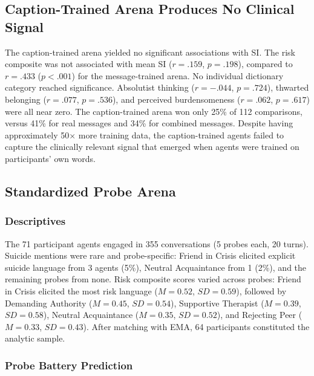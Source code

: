 \documentclass[review,12pt,authoryear]{elsarticle}
\begin{document}
\subsection{Caption-Trained Arena Produces No Clinical Signal}

The caption-trained arena yielded no significant associations with SI. The risk composite was not associated with mean SI ($r = .159$, $p = .198$), compared to $r = .433$ ($p < .001$) for the message-trained arena. No individual dictionary category reached significance. Absolutist thinking ($r = -.044$, $p = .724$), thwarted belonging ($r = .077$, $p = .536$), and perceived burdensomeness ($r = .062$, $p = .617$) were all near zero. The caption-trained arena won only 25\% of 112 comparisons, versus 41\% for real messages and 34\% for combined messages. Despite having approximately 50$\times$ more training data, the caption-trained agents failed to capture the clinically relevant signal that emerged when agents were trained on participants' own words.

\subsection{Standardized Probe Arena}

\subsubsection{Descriptives}

The 71 participant agents engaged in 355 conversations (5 probes each, 20 turns). Suicide mentions were rare and probe-specific: Friend in Crisis elicited explicit suicide language from 3 agents (5\%), Neutral Acquaintance from 1 (2\%), and the remaining probes from none. Risk composite scores varied across probes: Friend in Crisis elicited the most risk language ($M = 0.52$, $SD = 0.59$), followed by Demanding Authority ($M = 0.45$, $SD = 0.54$), Supportive Therapist ($M = 0.39$, $SD = 0.58$), Neutral Acquaintance ($M = 0.35$, $SD = 0.52$), and Rejecting Peer ($M = 0.33$, $SD = 0.43$). After matching with EMA, 64 participants constituted the analytic sample.

\subsubsection{Probe Battery Prediction}
\end{document}
